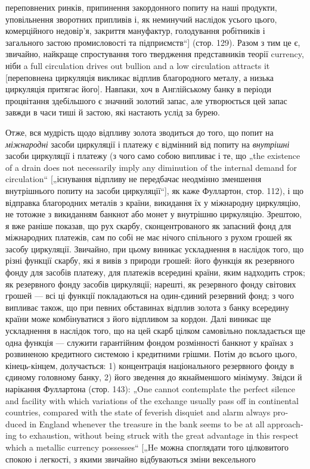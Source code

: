 \parcont{}  %
переповнених ринків, припинення закордонного попиту на наші
продукти, уповільнення зворотних припливів і, як неминучий
наслідок усього цього, комерційного недовір’я, закриття мануфактур,
голодування робітників і загального застою промисловості
та підприємств“] (стор. 129). Разом з тим це є, звичайно,
найкраще спростування того твердження представників теорії
currency, ніби a full circulation drives out bullion and a low circulation
attracts it [переповнена циркуляція викликає відплив благородного
металу, а низька циркуляція притягає його]. Навпаки,
хоч в Англійському банку в періоди процвітання здебільшого є
значний золотий запас, але утворюється цей запас завжди в часи
тиші й застою, які настають услід за бурею.

Отже, вся мудрість щодо відпливу золота зводиться до того,
що попит на \emph{міжнародні} засоби циркуляції і платежу є відмінний
від попиту на \emph{внутрішні} засоби циркуляції і платежу (з чого
само собою випливає і те, що „the existence of a drain does not
necessarily imply any diminution of the internal demand for circulation“
[„існування відпливу не передбачає неодмінно зменшення
внутрішнього попиту на засоби циркуляції“], як каже Фуллартон,
стор. 112), і що відправка благородних металів з країни,
викидання їх у міжнародну циркуляцію, не тотожне з викиданням
банкнот або монет у внутрішню циркуляцію. Зрештою,
я вже раніше показав, що рух скарбу, сконцентрованого як запасний
фонд для міжнародних платежів, сам по собі не має
нічого спільного з рухом грошей як засобу циркуляції. Звичайно,
при цьому виникає ускладнення в наслідок того, що різні функції
скарбу, які я вивів з природи грошей: його функція як резервного
фонду для засобів платежу, для платежів всередині
країни, яким надходить строк; як резервного фонду засобів циркуляції;
нарешті, як резервного фонду світових грошей — всі ці
функції покладаються на один-єдиний резервний фонд; з чого випливає
також, що при певних обставинах відплив золота з банку
всередину країни може комбінуватися з його відпливом за кордон.
Далі виникає ще ускладнення в наслідок того, що на цей скарб
цілком самовільно покладається ще одна функція — служити гарантійним
фондом розмінності банкнот у країнах з розвиненою
кредитного системою і кредитними грішми. Потім до всього
цього, кінець-кінцем, долучається: 1) концентрація національного
резервного фонду в єдиному головному банку, 2) його зведення
до якнайменшого мінімуму. Звідси й нарікання Фуллартона
(стор. 143): „\textenglish{One cannot contemplate the perfect silence and facility
with which variations of the exchange usually pass off in continental
countries, compared with the state of feverish disquiet and
alarm always produced in England whenever the treasure in the
bank seems to be at all approaching to exhaustion, without being
struck with the great advantage in this respect which a metallic currency
possesses}“ [„He можна споглядати того цілковитого спокою
і легкості, з якими звичайно відбуваються зміни вексельного
\parbreak{}  %

